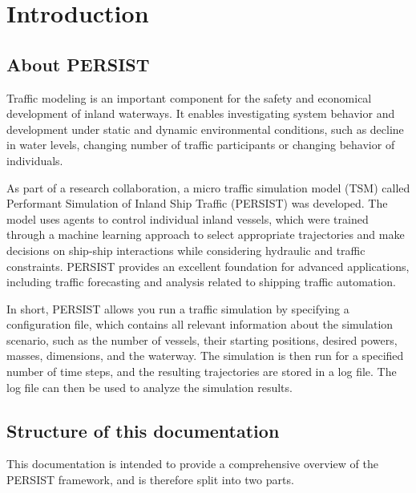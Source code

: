 \documentclass[
	a4paper, %
	12pt, %
]{persist}
\begin{document}
\newpage

\section{Introduction} 

\subsection{About PERSIST} %

Traffic modeling is an important component for the safety and economical development of inland waterways. It enables investigating system behavior and development under static and dynamic environmental conditions, such as decline in water levels, changing number of traffic participants or changing behavior of individuals.

As part of a research collaboration, a micro traffic simulation model (TSM) called Performant Simulation of Inland Ship Traffic (PERSIST) was developed. The model uses agents to control individual inland vessels, which were trained through a machine learning approach to select appropriate trajectories and make decisions on ship-ship interactions while considering hydraulic and traffic constraints. PERSIST provides an excellent foundation for advanced applications, including traffic forecasting and analysis related to shipping traffic automation. 

In short, PERSIST allows you run a traffic simulation by specifying a configuration file, which contains all relevant information about the simulation scenario, such as the number of vessels, their starting positions, desired powers, masses, dimensions, and the waterway. The simulation is then run for a specified number of time steps, and the resulting trajectories are stored in a log file. The log file can then be used to analyze the simulation results.

\subsection{Structure of this documentation} %

This documentation is intended to provide a comprehensive overview of the PERSIST framework, and is therefore split into two parts. 
\end{document}

